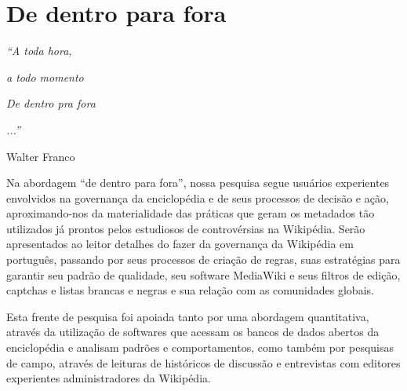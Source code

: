 \chapter{De dentro para fora}

\singlespacing
\begin{flushright}
\textit{``A toda hora,}

\textit{a todo momento}

\textit{De dentro pra fora}

\textit{...''}

Walter Franco
\end{flushright}
\doublespacing

Na abordagem ``de dentro para fora'', nossa pesquisa segue usuários experientes envolvidos na governança da enciclopédia e de seus processos de decisão e ação, aproximando-nos da materialidade das práticas que geram os metadados tão utilizados já prontos pelos estudiosos de controvérsias na Wikipédia. Serão apresentados ao leitor detalhes do fazer da governança da Wikipédia em português, passando por seus processos de criação de regras, suas estratégias para garantir seu padrão de qualidade, seu software MediaWiki e seus filtros de edição, captchas e listas brancas e negras e sua relação com as comunidades globais.

Esta frente de pesquisa foi apoiada tanto por uma abordagem quantitativa, através da utilização de softwares que acessam os bancos de dados abertos da enciclopédia e analisam padrões e comportamentos, como também por pesquisas de campo, através de leituras de históricos de discussão e entrevistas com editores experientes administradores da Wikipédia.





